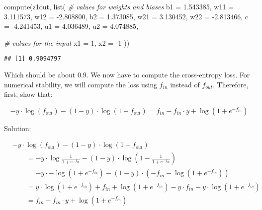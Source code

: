 \documentclass[
  a4paper,
]{article}
\newenvironment{Shaded}{\begin{snugshade}}{\end{snugshade}}
\newcommand{\AttributeTok}[1]{\textcolor[rgb]{0.77,0.63,0.00}{#1}}
\newcommand{\CommentTok}[1]{\textcolor[rgb]{0.56,0.35,0.01}{\textit{#1}}}
\newcommand{\DecValTok}[1]{\textcolor[rgb]{0.00,0.00,0.81}{#1}}
\newcommand{\FloatTok}[1]{\textcolor[rgb]{0.00,0.00,0.81}{#1}}
\newcommand{\FunctionTok}[1]{\textcolor[rgb]{0.00,0.00,0.00}{#1}}
\newcommand{\NormalTok}[1]{#1}
\newcommand{\SpecialCharTok}[1]{\textcolor[rgb]{0.00,0.00,0.00}{#1}}
\begin{document}
\begin{Shaded}
\begin{Highlighting}[]
\FunctionTok{compute}\NormalTok{(z1out, }\FunctionTok{list}\NormalTok{(}
  \CommentTok{\# values for weights and biases}
  \AttributeTok{b1 =} \FloatTok{1.543385}\NormalTok{, }\AttributeTok{w11 =} \FloatTok{3.111573}\NormalTok{, }\AttributeTok{w12 =} \SpecialCharTok{{-}}\FloatTok{2.808800}\NormalTok{,}
  \AttributeTok{b2 =} \FloatTok{1.373085}\NormalTok{, }\AttributeTok{w21 =} \FloatTok{3.130452}\NormalTok{, }\AttributeTok{w22 =} \SpecialCharTok{{-}}\FloatTok{2.813466}\NormalTok{,}
  \AttributeTok{c =} \SpecialCharTok{{-}}\FloatTok{4.241453}\NormalTok{, }\AttributeTok{u1 =} \FloatTok{4.036489}\NormalTok{, }\AttributeTok{u2 =} \FloatTok{4.074885}\NormalTok{,}
  
  \CommentTok{\# values for the input}
  \AttributeTok{x1 =} \DecValTok{1}\NormalTok{, }\AttributeTok{x2 =} \SpecialCharTok{{-}}\DecValTok{1}
\NormalTok{))}
\end{Highlighting}
\end{Shaded}

\begin{verbatim}
## [1] 0.9094797
\end{verbatim}

Which should be about 0.9. We now have to compute the cross-entropy
loss. For numerical stability, we will compute the loss using \(f_{in}\)
instead of \(f_{out}\). Therefore, first, show that:

\begin{equation}
-y\cdot\log(f_{out})-(1-y)\cdot\log(1-f_{out})=
f_{in}-f_{in}\cdot y+\log(1+e^{-f_{in}})
\end{equation}

Solution:

\begin{align}
&-y\cdot\log (f_{out})-(1-y)\cdot\log(1-f_{out}) \\
&\qquad=-y\cdot\log\frac{1}{1+e^{-f_{in}}}-(1-y)\cdot\log\left(1-\frac{1}{1+e^{-f_{in}}}\right) \\
&\qquad=
-y\cdot-\log\left(1+e^{-f_{in}}\right)
-(1-y)\cdot\left(-f_{in}-\log\left(1+e^{-f_{in}}\right)\right) \\
&\qquad=
y\cdot\log\left(1+e^{-f_{in}}\right)
+f_{in}+\log\left(1+e^{-f_{in}}\right)
-y\cdot f_{in}-y\cdot\log\left(1+e^{-f_{in}}\right) \\
&\qquad=f_{in}-f_{in}\cdot y+\log(1+e^{-f_{in}})
\end{align}
\end{document}
